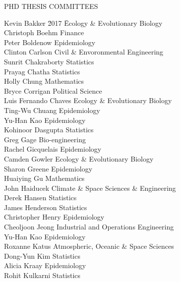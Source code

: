 \begin{mylist}{PHD THESIS COMMITTEES}

\item 
\begin{tabbing}
Kevin Bakker \hspace{2cm} \= 2017 \hspace{1cm} \= Ecology \& Evolutionary Biology\\
Christoph Boehm   \> Finance\\
Peter Boldenow  \> Epidemiology\\
Clinton Carlson  \> Civil \& Envoronmental Engineering\\
Sunrit Chakraborty  \> Statistics\\
Prayag Chatha  \> Statistics\\
Holly Chung  \> Mathematics\\
Bryce Corrigan  \> Political Science\\
Luis Fernando Chaves  \> Ecology \& Evolutionary Biology\\
Ting-Wu Chuang  \> Epidemiology\\
Yu-Han Kao  \> Epidemiology\\
Kohinoor Dasgupta  \> Statistics \\
Greg Gage  \> Bio-engineering\\ 
Rachel Gicquelais  \> Epidemiology\\
Camden Gowler  \> Ecology \& Evolutionary Biology\\
Sharon Greene  \> Epidemiology\\ 
Huaiying Gu  \> Mathematics\\
John Haiducek \> Climate \& Space Sciences \& Engineering\\
Derek Hansen \> Statistics\\
James Henderson  \> Statistics\\
Christopher Henry  \> Epidemiology\\
Cheoljoon Jeong  \> Industrial and Operations Engineering\\
Yu-Han Kao  \> Epidemiology\\
Roxanne Katus  \> Atmospheric, Oceanic \& Space Sciences\\
Dong-Yun Kim  \> Statistics\\
Alicia Kraay  \> Epidemiology\\
Rohit Kulkarni  \> Statistics\\

\end{tabbing}
\end{mylist}
